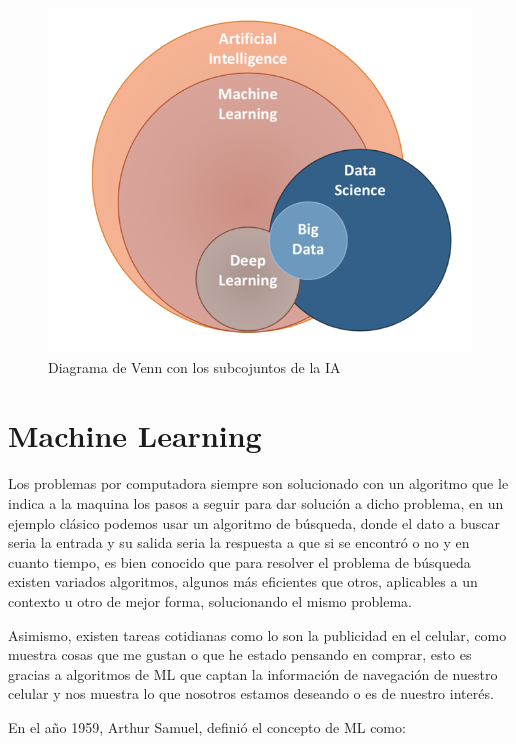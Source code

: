 \begin{figure}[h]
	\centering
	\includegraphics[scale=0.51]{img/Marco Teorico/Expertiz.png} 
	\caption{Diagrama de Venn con los subcojuntos de la IA}
\end{figure}


\doublespacing
\section{Machine Learning}
Los problemas por computadora siempre son solucionado con un algoritmo que le indica a la maquina los pasos a seguir para dar solución a dicho problema, en un ejemplo clásico podemos usar un algoritmo de búsqueda, donde el dato a buscar seria la entrada y su salida seria la respuesta a que si se encontró o no y en cuanto tiempo, es bien conocido que para resolver el problema de búsqueda existen variados algoritmos, algunos más eficientes que otros, aplicables a un contexto u otro de mejor forma, solucionando el mismo problema.\\
\par Asimismo, existen tareas cotidianas como lo son la publicidad en el celular, como muestra cosas que me gustan o que he estado pensando en comprar, esto es gracias a algoritmos de ML que captan la información de navegación de nuestro celular y nos muestra lo que nosotros estamos deseando o es de nuestro interés.\\
\par En el año 1959, Arthur Samuel, definió el concepto de ML como:

